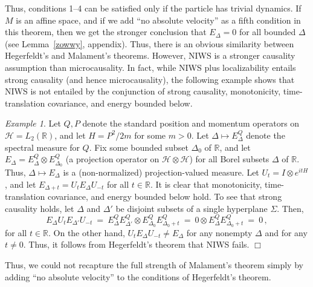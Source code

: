 \documentclass[12pt]{article}
\theoremstyle{remark}
\newtheorem{example}{Example}
\newcommand{\hil}[1]{\mathcal{#1}}
\begin{document}
Thus, conditions 1--4 can be satisfied only if the particle has
trivial dynamics.  If $M$ is an affine space, and if we add ``no
absolute velocity'' as a fifth condition in this theorem, then we get
the stronger conclusion that $E_{\Delta}=0$ for all bounded $\Delta$
(see Lemma~\ref{zowwy}, appendix).  Thus, there is an obvious
similarity between Hegerfeldt's and Malament's theorems.  However,
NIWS is a stronger causality assumption than microcausality.  In fact,
while NIWS plus localizability entails strong causality (and hence
microcausality), the following example shows that NIWS is not entailed
by the conjunction of strong causality, monotonicity, time-translation
covariance, and energy bounded below.
\begin{example} \label{descartes} Let $Q,P$ denote the standard
  position and momentum operators on $\hil{H}=L_{2}(\mathbb{R})$, and
  let $H=P^{2}/2m$ for some $m>0$.  Let $\Delta \mapsto
  E^{Q}_{\Delta}$ denote the spectral measure for $Q$.  Fix some
  bounded subset $\Delta _{0}$ of $\mathbb{R}$, and let
  $E_{\Delta}=E^{Q}_{\Delta}\otimes E^{Q}_{\Delta _{0}}$ (a projection
  operator on $\hil{H}\otimes \hil{H}$) for all Borel subsets $\Delta$
  of $\mathbb{R}$.  Thus, $\Delta \mapsto E_{\Delta}$ is a
  (non-normalized) projection-valued measure.  Let $U_{t}=I\otimes
  e^{itH}$, and let $E_{\Delta +t}=U_{t}E_{\Delta}U_{-t}$ for all
  $t\in \mathbb{R}$.  It is clear that monotonicity, time-translation
  covariance, and energy bounded below hold.  To see that strong
  causality holds, let $\Delta$ and $\Delta '$ be disjoint subsets of
  a single hyperplane $\Sigma$.  Then,
\begin{equation}
E_{\Delta}U_{t}E_{\Delta '}U_{-t}\:=\:E^{Q}_{\Delta}E^{Q}_{\Delta '}\otimes
  E^{Q}_{\Delta _{0}}E^{Q}_{\Delta _{0}+t}\:=\: 
0\otimes E^{Q}_{\Delta}E^{Q}_{\Delta _{0}+t}\:=\: 0 \,,\end{equation}
for all $t\in \mathbb{R}$.  On the other hand, 
  $U_{t}E_{\Delta}U_{-t}\neq E_{\Delta}$ for any nonempty $\Delta$ and
  for any $t\neq 0$.  
Thus, it follows from Hegerfeldt's theorem that NIWS fails.  \hfill $\Box$
\end{example}
Thus, we could not recapture the full strength of Malament's theorem
simply by adding ``no absolute velocity'' to the conditions of
Hegerfeldt's theorem.
\end{document}
